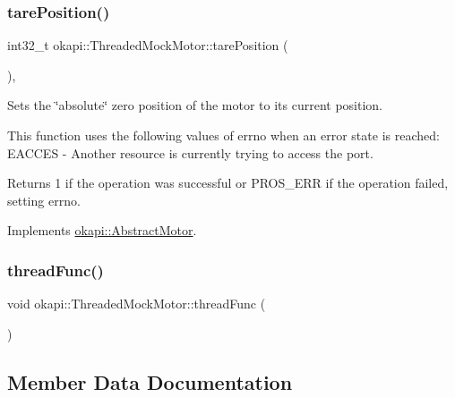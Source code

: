 \subsubsection{\texorpdfstring{tarePosition()}{tarePosition()}}
{\footnotesize\ttfamily int32\+\_\+t okapi\+::\+Threaded\+Mock\+Motor\+::tare\+Position (\begin{DoxyParamCaption}{ }\end{DoxyParamCaption})\hspace{0.3cm}{\ttfamily [override]}, {\ttfamily [virtual]}}



Sets the \char`\"{}absolute\char`\"{} zero position of the motor to its current position. 

This function uses the following values of errno when an error state is reached\+: E\+A\+C\+C\+ES -\/ Another resource is currently trying to access the port.

\begin{DoxyReturn}{Returns}
1 if the operation was successful or P\+R\+O\+S\+\_\+\+E\+RR if the operation failed, setting errno. 
\end{DoxyReturn}


Implements \mbox{\hyperlink{classokapi_1_1AbstractMotor_ac36edbc92db85a11adcfee56275de15b}{okapi\+::\+Abstract\+Motor}}.

\mbox{\label{classokapi_1_1ThreadedMockMotor_a725e1ee6b45843d4af1cd1385b0a938b}} 
\subsubsection{\texorpdfstring{threadFunc()}{threadFunc()}}
{\footnotesize\ttfamily void okapi\+::\+Threaded\+Mock\+Motor\+::thread\+Func (\begin{DoxyParamCaption}{ }\end{DoxyParamCaption})}



\subsection{Member Data Documentation}
\mbox{\label{classokapi_1_1ThreadedMockMotor_adf8c3cccf3e9dd054f4772eaa32af7b5}} 
